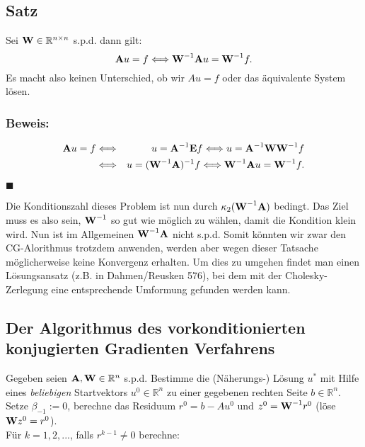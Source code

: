 \subsection{Satz}

Sei ${\textbf{W}} \in \mathbb{R}^{n \times n}$ s.p.d. dann gilt:
\begin{equation}
{\textbf{A}}u = f \Longleftrightarrow {\textbf{W}}^{-1} {\textbf{A}} u = {\textbf{W}}^{-1} f.
\end{equation}
Es macht also keinen Unterschied, ob wir $Au = f$ oder das äquivalente System lösen.

\subsubsection{Beweis:}

\begin{eqnarray}
{\textbf{A}}u = f &\Longleftrightarrow& u = {\textbf{A}}^{-1} {\textbf{E}} f \Longleftrightarrow u = {\textbf{A}}^{-1} {\textbf{W}} {\textbf{W}}^{-1} f \notag \\
&\Longleftrightarrow& u = ({\textbf{W}}^{-1} {\textbf{A}})^{-1} f \Longleftrightarrow {\textbf{W}}^{-1} {\textbf{A}} u = {\textbf{W}}^{-1} f. \notag
\end{eqnarray}
\begin{flushright}
$\blacksquare$
\end{flushright}

Die Konditionszahl dieses Problem ist nun durch $\kappa_{2}({\textbf{W}}^{-1}{\textbf{A}})$ bedingt. Das Ziel muss es also sein, ${\textbf{W}}^{-1}$ so gut wie möglich zu wählen, damit die Kondition klein wird. Nun ist im Allgemeinen ${\textbf{W}}^{-1}{\textbf{A}}$ nicht s.p.d. Somit könnten wir zwar den CG-Alorithmus trotzdem anwenden, werden aber wegen dieser Tatsache möglicherweise keine Konvergenz erhalten. Um dies zu umgehen findet man einen Lösungsansatz (z.B. in Dahmen/Reusken 576), bei dem mit der Cholesky-Zerlegung eine entsprechende Umformung gefunden werden kann.

\subsection{Der Algorithmus des vorkonditionierten konjugierten Gradienten Verfahrens}\label{ss.Algorithmus PCG}

Gegeben seien ${\textbf{A}}, {\textbf{W}} \in \mathbb{R}^{n}$ s.p.d. Bestimme die (Näherungs-) Lösung $u^{*}$ mit Hilfe eines \textit{beliebigen} Startvektors $u^{0} \in \mathbb{R}^{n}$ zu einer gegebenen rechten Seite $b \in \mathbb{R}^{n}$. Setze $\beta_{-1} := 0$, berechne das Residuum $r^{0} = b - Au^{0}$ und $z^{0} = {\textbf{W}}^{-1}r^{0}$ (löse ${\textbf{W}}z^{0} = r^{0}$).\\
Für $k = 1,2,...$, falls $r^{k-1} \ne 0$ berechne:

